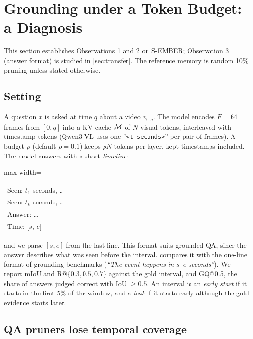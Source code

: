\section{Grounding under a Token Budget: a Diagnosis}
\label{sec:diagnosis}

This section establishes Observations 1 and 2 on S-EMBER; Observation 3 (answer format) is studied in
\cref{sec:transfer}. The reference memory is random 10\% pruning unless stated otherwise.

\subsection{Setting}
\label{sec:setting}

A question $x$ is asked at time $q$ about a video $v_{0:q}$. The model encodes $F{=}64$ frames from $[0,q]$ into a
KV cache $\mathcal{M}$ of $N$ visual tokens, interleaved with timestamp tokens (Qwen3-VL uses one ``\texttt{<t seconds>}''
per pair of frames). A budget $\rho$ (default $\rho{=}0.1$) keeps $\rho N$ tokens per layer, kept timestamps
included. The model answers with a short \emph{timeline}:
\begin{center}
\small\ttfamily
\begin{adjustbox}{max width=\linewidth}\begin{tabular}{l}
Seen: $t_1$ seconds, \dots \\
Seen: $t_k$ seconds, \dots \\
Answer: \dots \\
Time: [$s$, $e$]
\end{tabular}\end{adjustbox}
\end{center}
and we parse $[s,e]$ from the last line. This format suits grounded QA, since the answer describes what was seen
before the interval.  compares it with the one-line format of grounding benchmarks (\emph{``The event happens in $s$--$e$ seconds''}). We report mIoU and
R@$\{0.3, 0.5, 0.7\}$ against the gold interval, and GQ@0.5, the share of answers judged correct with IoU $\geq 0.5$.
An interval is an \emph{early start} if it starts in the first 5\% of the window, and a \emph{leak} if it starts
early although the gold evidence starts later.

\subsection{QA pruners lose temporal coverage}
\label{sec:coverage-loss}


